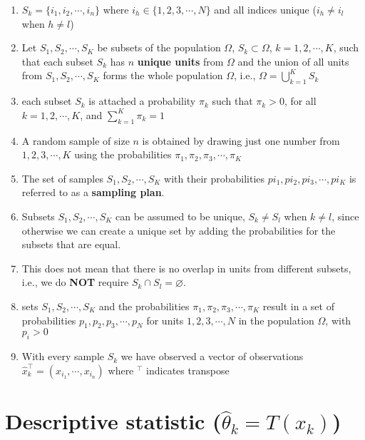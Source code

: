 \begin{enumerate}
    \item $S_k = \{i_1,i_2,\cdots,i_n\}$  where $i_h \in \{1, 2, 3,\cdots, N\}$ and all indices unique ($i_h \neq i_l$ when $h \neq l$)

    \item Let $S_1, S_2, \cdots, S_K$ be subsets of the population $\Omega$, $S_k \subset \Omega$, $k = 1, 2,\cdots, K$, such that each subset $S_k$ has $n$ \textbf{unique units} from $\Omega$ and the union of all units from $S_1, S_2,\cdots, S_K$ forms the whole population $\Omega$, i.e., ${\displaystyle \Omega = \bigcup_{k=1}^{K} S_k}$
    
    \item each subset $S_k$ is attached a probability $\pi_k$ such that $\pi_k > 0$, for all $k = 1, 2,\cdots, K$, and ${\displaystyle \sum_{k=1}^{K} \pi_k = 1}$

    \item A random sample of size $n$ is obtained by drawing just one number from $1, 2, 3,\cdots, K$ using the probabilities $\pi_1, \pi_2, \pi_3,\cdots,\pi_K$

    \item The set of samples $S_1, S_2,\cdots, S_K$ with their probabilities $pi_1, pi_2, pi_3,\cdots ,pi_K$ is referred to as a \textbf{sampling plan}.

    \item Subsets $S_1, S_2, \cdots, S_K$ can be assumed to be unique, $S_k \neq S_l$ when $k \neq l$, since otherwise we can create a unique set by adding the probabilities for the subsets that are equal.

    \item This does not mean that there is no overlap in units from different subsets, i.e., we do \textbf{NOT} require $S_k \cap S_l = \varnothing$.

    \item sets $S_1, S_2,\cdots, S_K$ and the probabilities $\pi_1, \pi_2, \pi_3,\cdots,\pi_K$ result in a set of probabilities $p_1, p_2, p_3,\cdots, p_N$ for units $1, 2, 3,\cdots, N$ in the population $\Omega$, with $p_i > 0$

    \item With every sample $S_k$ we have observed a vector of observations $\hat{x}_k^\top = (x_{i_1},\cdots,x_{i_n})$ where  $^\top$ indicates transpose

\end{enumerate}


\section{Descriptive statistic ($\hat{\theta}_k = T(x_k)$) \cite{ism-1}}\label{Descriptive statistic}

